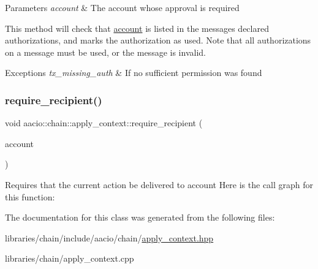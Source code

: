 \begin{DoxyParams}{Parameters}
{\em account} & The account whose approval is required\\
\hline
\end{DoxyParams}
This method will check that \mbox{\hyperlink{structaccount}{account}} is listed in the message\textquotesingle{}s declared authorizations, and marks the authorization as used. Note that all authorizations on a message must be used, or the message is invalid.


\begin{DoxyExceptions}{Exceptions}
{\em tx\+\_\+missing\+\_\+auth} & If no sufficient permission was found \\
\hline
\end{DoxyExceptions}
\mbox{\label{classaacio_1_1chain_1_1apply__context_a767dfd92447d09361a20944e34a0b66a}} 
\subsubsection{\texorpdfstring{require\+\_\+recipient()}{require\_recipient()}}
{\footnotesize\ttfamily void aacio\+::chain\+::apply\+\_\+context\+::require\+\_\+recipient (\begin{DoxyParamCaption}\item[{\mbox{\hyperlink{structaacio_1_1chain_1_1name}{account\+\_\+name}}}]{account }\end{DoxyParamCaption})}

Requires that the current action be delivered to account Here is the call graph for this function\+:


The documentation for this class was generated from the following files\+:\begin{DoxyCompactItemize}
\item 
libraries/chain/include/aacio/chain/\mbox{\hyperlink{apply__context_8hpp}{apply\+\_\+context.\+hpp}}\item 
libraries/chain/apply\+\_\+context.\+cpp\end{DoxyCompactItemize}
